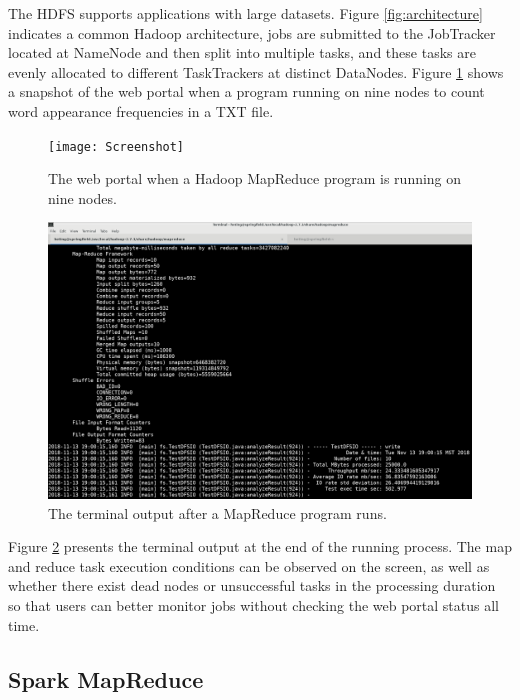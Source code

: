 \documentclass[11pt,twocolumn]{article}
\begin{document}
The HDFS supports applications with large datasets. Figure \ref{fig:architecture} indicates a common Hadoop architecture, jobs are submitted to the JobTracker located at NameNode and then split into multiple tasks, and these tasks are evenly allocated to different TaskTrackers at distinct DataNodes. Figure \ref{fig:snapshot} shows a snapshot of the web portal when a  program running on nine nodes to count word appearance frequencies in a TXT file.
\begin{figure}[ht]
    \centering
        \texttt{[image: Screenshot]}
        \caption{The web portal when a Hadoop MapReduce program is running on nine nodes.}
        \label{fig:snapshot}
\end{figure}
\begin{figure}[ht]
    \centering
   \includegraphics[width=\linewidth]{hadoop}
        \caption{The terminal output after a MapReduce program runs.}
        \label{fig:hadoop}
\end{figure}
Figure \ref{fig:hadoop} presents the terminal output at the end of the running process. The map and reduce task execution conditions can be observed on the screen, as well as whether there exist dead nodes or unsuccessful tasks in the processing duration so that users can better monitor jobs without checking the web portal status all time.

\subsection*{Spark MapReduce}
\end{document}
